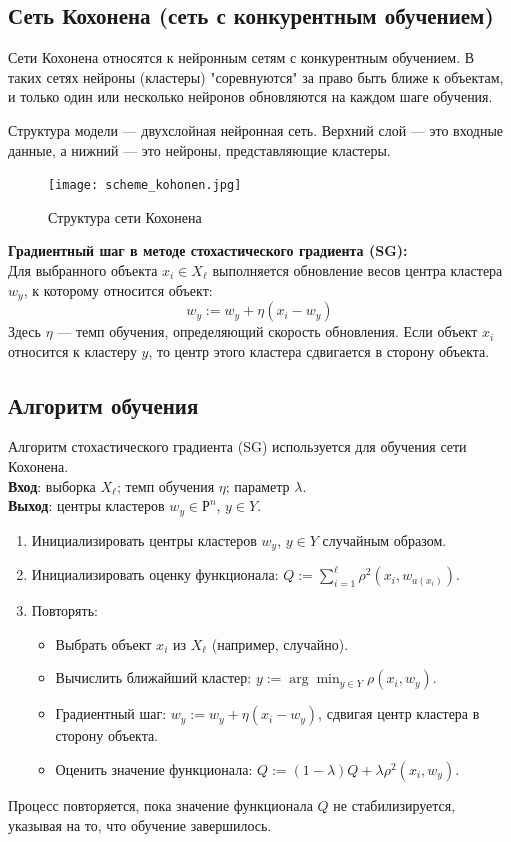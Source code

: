 \begin{itemize}
\subsection{Сеть Кохонена (сеть с конкурентным обучением)}
Сети Кохонена относятся к нейронным сетям с конкурентным обучением. В таких сетях нейроны (кластеры) "соревнуются" за право быть ближе к объектам, и только один или несколько нейронов обновляются на каждом шаге обучения.

Структура модели — двухслойная нейронная сеть. Верхний слой — это входные данные, а нижний — это нейроны, представляющие кластеры.

\begin{figure}[h]
\centering
\texttt{[image: scheme\_kohonen.jpg]}
\caption{Структура сети Кохонена}
\end{figure}

\textbf{Градиентный шаг в методе стохастического градиента (SG):}\\
Для выбранного объекта $x_i \in X_\ell$ выполняется обновление весов центра кластера $w_y$, к которому относится объект:
\[
w_y := w_y + \eta(x_i - w_y)
\]
Здесь $\eta$ — темп обучения, определяющий скорость обновления. Если объект $x_i$ относится к кластеру $y$, то центр этого кластера сдвигается в сторону объекта.

\subsection{Алгоритм обучения}
Алгоритм стохастического градиента (SG) используется для обучения сети Кохонена.\\

\textbf{Вход}: выборка $X_\ell$; темп обучения $\eta$; параметр $\lambda$.  \\
\textbf{Выход}: центры кластеров $w_y \in \mathbb{Р}^n$, $y \in Y$.

\begin{enumerate}
    \item Инициализировать центры кластеров $w_y$, $y \in Y$ случайным образом.
    \item Инициализировать оценку функционала: $Q := \sum_{i=1}^{\ell} \rho^2(x_i, w_{a(x_i)})$.
    \item Повторять:
        \begin{itemize}
            \item Выбрать объект $x_i$ из $X_\ell$ (например, случайно).
            \item Вычислить ближайший кластер: $y := \arg \min_{y \in Y} \rho(x_i, w_y)$.
            \item Градиентный шаг: $w_y := w_y + \eta(x_i - w_y)$, сдвигая центр кластера в сторону объекта.
            \item Оценить значение функционала: $Q := (1 - \lambda) Q + \lambda \rho^2(x_i, w_y)$.
        \end{itemize}
\end{enumerate}
Процесс повторяется, пока значение функционала $Q$ не стабилизируется, указывая на то, что обучение завершилось.


\end{itemize}
